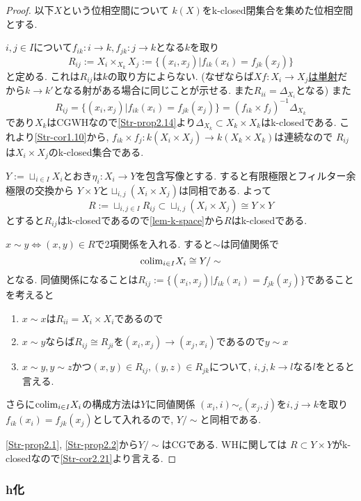 \documentclass[dvipdfmx,a4paper,11pt]{report}
\newcommand{\colim}{{\rm colim}}
\theoremstyle{definition}
\begin{document}
\begin{proof}
以下$X$という位相空間について
$k(X)$をk-closed閉集合を集めた位相空間とする. 


$i,j \in I$について$f_{ik}:i \to k, f_{jk}: j \to k$となる$k$を取り
$$
R_{ij}:= X_{i} \times_{X_{k}} X_{j} := \{ (x_i, x_j) | f_{ik}(x_i) = f_{jk}(x_j)\}
$$
と定める. 
これは$R_{ij}$は$k$の取り方によらない. 
(なぜならば\underline{$Xf : X_i \to X_j$は単射}だから$k \to k'$となる射がある場合に同じことが示せる. また$R_{ii}= \Delta_{X_i}$となる)
また
$$
R_{ij}=\{ (x_i, x_j) | f_{ik}(x_i) = f_{jk}(x_j)\} = (f_{ik} \times f_{j})^{-1}\Delta_{X_k}
$$
であり$X_k$はCGWHなので\ref{Str-prop2.14}より$\Delta_{X_{k}} \subset X_k \times X_k$はk-closedである.
これより\ref{Str-cor1.10}から, $f_{ik} \times f_{j} : k(X_i \times X_j) \to k(X_k \times X_k)$は連続なので
$R_{ij}$は$X_i \times X_j$のk-closed集合である. 

$Y :=\sqcup_{i \in I}X_{i}$とおき$\eta_i : X_i \to Y$を包含写像とする. 
すると有限極限とフィルター余極限の交換から
$Y \times Y $と$ \sqcup_{i,j} (X_i \times X_j) $は同相である. 
よって
$$
R := \sqcup_{i,j \in I}R_{ij} \subset \sqcup_{i,j} (X_i \times X_j) \cong Y \times Y
$$
とすると$R_{ij}$はk-closedであるので\ref{lem-k-space}から$R$はk-closedである. 

$x \sim y \Leftrightarrow (x,y) \in R$で2項関係を入れる.
すると$\sim$は同値関係で
$$
\colim_{i \in I}X_i  \cong Y/\sim
$$ 
となる.
同値関係になることは$R_{ij}:= \{ (x_i, x_j) | f_{ik}(x_i) = f_{jk}(x_j)\}$であることを考えると
\begin{enumerate}
\item  $x \sim x$は$R_{ii}=X_{i} \times X_{i}$であるので
\item $x \sim y$ならば$R_{ij} \cong R_{ji}$を$(x_i, x_j) \to (x_j, x_i)$であるので$y \sim x$
\item $x \sim y, y \sim z$かつ$(x,y) \in R_{ij}, (y,z) \in R_{jk}$について, $i,j,k \to l$なる$l$をとると言える. 
\end{enumerate}
さらに$\colim_{i \in I}X_i  $の構成方法は$Y$に同値関係
$(x_i, i)\sim_{c} (x_j, j)$を$i,j \to k$を取り$f_{ik}(x_i) = f_{jk}(x_j)$として入れるので, $Y/\sim$と同相である.

\ref{Str-prop2.1}, \ref{Str-prop2.2}から$Y/\sim$はCGである.
WHに関しては
$R \subset Y \times Y$がk-closedなので\ref{Str-cor2.21}より言える.

\end{proof}

\subsubsection{h化}
\end{document}
